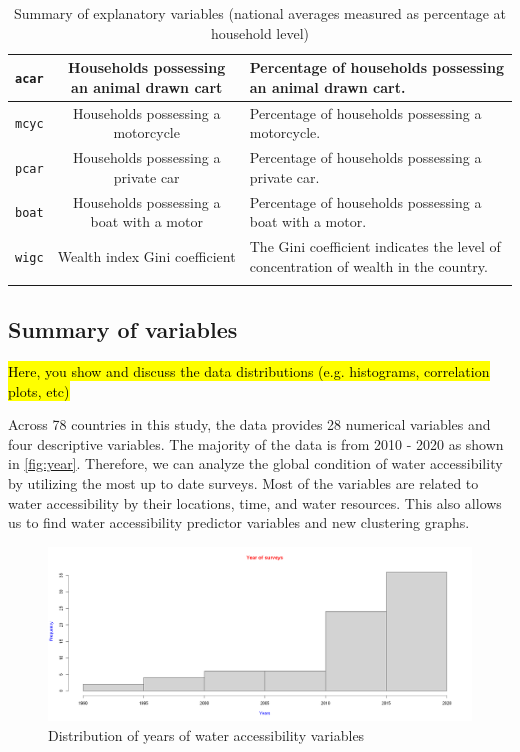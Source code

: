 \documentclass[10pt,twoside]{article}
\numberwithin{equation}{section}
\newcommand{\?}{\stackrel{?}{=}}
\begin{document}
\begin{table}[h!]
\begin{tabular}{c c m{5cm}}
 \texttt{acar} & Households possessing an animal drawn cart
 & Percentage of households possessing an animal drawn cart.
\\\hline
 \texttt{mcyc} & Households possessing a motorcycle
 & Percentage of households possessing a motorcycle.
\\\hline
 \texttt{pcar} & Households possessing a private car
 & Percentage of households possessing a private car.
\\\hline
 \texttt{boat} & Households possessing a boat with a motor
 & Percentage of households possessing a boat with a motor.
\\\hline
 \texttt{wigc} & Wealth index Gini coefficient
 & The Gini coefficient indicates the level of concentration of wealth in the country.
\\\hline
 & \\\bottomrule
  \end{tabular}
  \caption{Summary of explanatory variables (national averages measured as percentage at household level)}
  \label{tab:summary-var}
\end{table}
 \subsection*{Summary of variables}
\hl{Here, you show and discuss the data distributions (e.g. histograms, correlation plots, etc)}

Across 78 countries in this study, the data provides 28 numerical variables and four descriptive variables. The majority of the data is from 2010 - 2020 as shown in \autoref{fig:year}. Therefore, we can analyze the global condition of water accessibility by utilizing the most up to date surveys. Most of the variables are related to water accessibility by their locations, time, and water resources. This also allows us to find water accessibility predictor variables and new clustering graphs. 

\begin{figure}[h!]
  \centering
  \includegraphics[width=.7\textwidth]{year}
  \caption{Distribution of years of water accessibility variables}
  \label{fig:year}
\end{figure}
\end{document}
